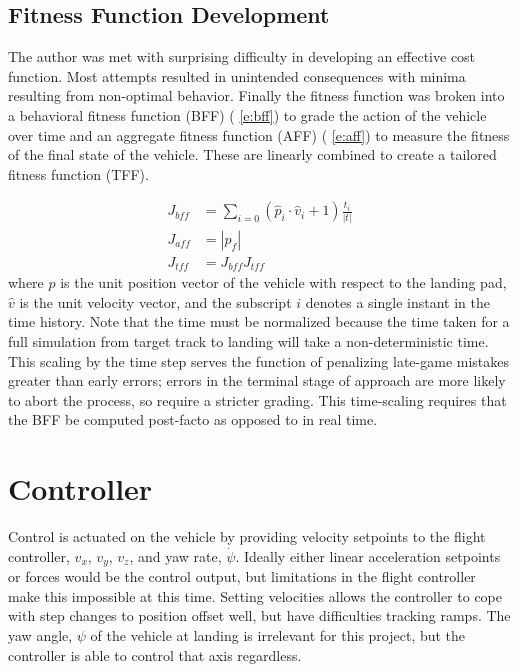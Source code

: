\subsection{Fitness Function Development} The author was met with surprising difficulty in developing an
effective cost function. Most attempts resulted in unintended consequences with minima resulting from
non-optimal behavior. Finally the fitness function was broken into a behavioral fitness function (BFF) (
\cref{e:bff}) to grade the action of the vehicle over time and an aggregate fitness function (AFF) (
\cref{e:aff}) to measure the fitness of the final state of the vehicle. These are linearly combined to create
a tailored fitness function (TFF)\cite{divband2015effect}.

\begin{align}
J_{bff} &= \sum_{i=0}\left(\hat{p}_i\cdot\hat{v}_i + 1\right)\frac{t_i}{|t|} \label{e:bff}\\
    J_{aff} &= |p_f| \label{e:aff}\\
    J_{tff} &= J_{bff}J_{tff}\label{e:ff}
\end{align}
where $\hat{p}$ is the unit position vector of the vehicle with respect to the landing pad, $\hat{v}$ is the
unit velocity vector, and the subscript $i$ denotes a single instant in the time history. Note that the time
must be normalized because the time taken for a full simulation from target track to landing will take a
non-deterministic time. This scaling by the time step serves the function of penalizing late-game mistakes
greater than early errors; errors in the terminal stage of approach are more likely to abort the process, so
require a stricter grading. This time-scaling requires that the BFF be computed post-facto as opposed to in
real time.

\section{Controller}\label{s:landing:controller}
Control is actuated on the vehicle by providing velocity setpoints to the flight controller, $v_x$, $v_y$,
$v_z$, and yaw rate, $\dot{\psi}$. Ideally either linear acceleration setpoints or forces would be the control
output, but limitations in the flight controller make this impossible at this time. Setting velocities allows
the controller to cope with step changes to position offset well, but have difficulties tracking ramps. The
yaw angle, $\psi$ of the vehicle at landing is irrelevant for this project, but the controller is able to
control that axis regardless.

